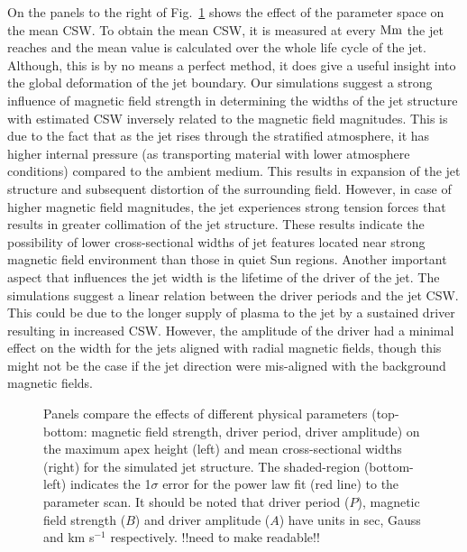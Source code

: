 \documentclass[12pt]{ociamthesis}
\begin{document}
%
On the panels to the right of Fig.~\ref{parameter_scan_lines} shows the effect of the parameter space on the mean CSW. To obtain the mean CSW, it is measured at every $\rm{Mm}$ the jet reaches and the mean value is calculated over the whole life cycle of the jet. Although, this is by no means a perfect method, it does give a useful insight into the global deformation of the jet boundary. Our simulations suggest a strong influence of magnetic field strength in determining the widths of the jet structure with estimated CSW inversely related to the magnetic field magnitudes. This is due to the fact that as the jet rises through the stratified atmosphere, it has higher internal pressure (as transporting material with lower atmosphere conditions) compared to the ambient medium. This results in expansion of the jet structure and subsequent distortion of the surrounding field. However, in case of higher magnetic field magnitudes, the jet experiences strong tension forces that results in greater collimation of the jet structure. These results indicate the possibility of lower cross-sectional widths of jet features located near strong magnetic field environment than those in quiet Sun regions. Another important aspect that influences the jet width is the lifetime of the driver of the jet. The simulations suggest a linear relation between the driver periods and the jet CSW. This could be due to the longer supply of plasma to the jet by a sustained driver resulting in increased CSW. However, the amplitude of the driver had a minimal effect on the width for the jets aligned with radial magnetic fields, though this might not be the case if the jet direction were mis-aligned with the background magnetic fields.
\begin{figure}
\captionsetup[subfigure]{labelformat=empty}
\centering
{} 
\caption{Panels compare the effects of different physical parameters (top-bottom: magnetic field strength, driver period, driver amplitude) on the maximum apex height (left) and mean cross-sectional widths (right) for the simulated jet structure. The shaded-region (bottom-left) indicates the 1$\sigma$ error for the power law fit (red line) to the parameter scan. It should be noted that driver period ($P$), magnetic field strength ($B$) and driver amplitude ($A$) have units in sec, Gauss and km s$^{-1}$ respectively. {\color{green}!!need to make readable!!}}
\label{parameter_scan_lines}
\end{figure}
\end{document}
